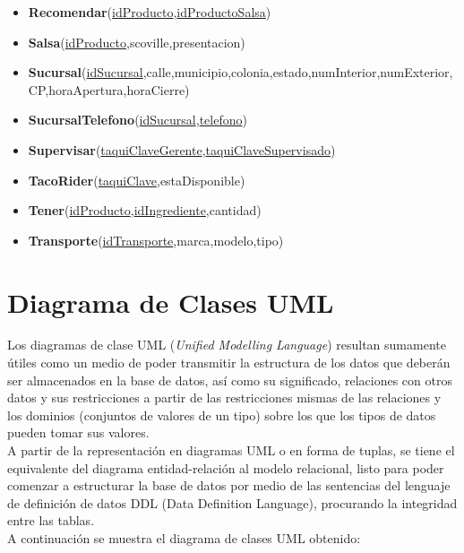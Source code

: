 \documentclass[11pt,letterpaper]{article}
\begin{document}
\begin{itemize}
\item \footnotesize{\textbf{Recomendar}(\underline{idProducto},\underline{idProductoSalsa})}
\item \footnotesize{\textbf{Salsa}(\underline{idProducto},scoville,presentacion)}
\item {\footnotesize \textbf{Sucursal}(\underline{idSucursal},calle,municipio,colonia,estado,numInterior,numExterior,CP,horaApertura,horaCierre)}
\item \footnotesize{\textbf{SucursalTelefono}(\underline{idSucursal},\underline{telefono})}
\item \footnotesize{\textbf{Supervisar}(\underline{taquiClaveGerente},\underline{taquiClaveSupervisado})}
\item \footnotesize{\textbf{TacoRider}(\underline{taquiClave},estaDisponible)}
\item \footnotesize{\textbf{Tener}(\underline{idProducto},\underline{idIngrediente},cantidad)}
\item \footnotesize{\textbf{Transporte}(\underline{idTransporte},marca,modelo,tipo)}



\end{itemize}
\section{Diagrama de Clases UML}

Los diagramas de clase UML (\textit{Unified Modelling Language}) resultan sumamente útiles como un medio de poder transmitir la estructura de los datos que deberán ser almacenados en la base de datos, así como su significado, relaciones con otros datos y sus restricciones a partir de las restricciones mismas de las relaciones y los dominios (conjuntos de valores de un tipo) sobre los que los tipos de datos pueden
tomar sus valores.\\

A partir de la representación en diagramas UML o en forma de tuplas, se tiene el equivalente del diagrama entidad-relación al modelo relacional, listo
para poder comenzar a estructurar la base de datos por medio de las sentencias del lenguaje de definición de datos DDL (Data Definition Language), procurando la integridad entre las tablas.\\

A continuación se muestra el diagrama de clases UML obtenido:
\end{document}
